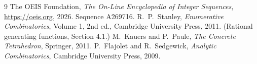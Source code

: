 \documentclass[11pt,a4paper]{article}
\theoremstyle{plain}
\theoremstyle{definition}
\begin{document}
\begin{thebibliography}{9}
 The OEIS Foundation, \emph{The On-Line Encyclopedia of Integer
Sequences}, \url{https://oeis.org}, 2026. Sequence A269716.
 R.~P.~Stanley, \emph{Enumerative Combinatorics}, Volume 1, 2nd ed.,
Cambridge University Press, 2011. (Rational generating functions, Section 4.1.)
 M.~Kauers and P.~Paule, \emph{The Concrete Tetrahedron}, Springer, 2011.
 P.~Flajolet and R.~Sedgewick, \emph{Analytic Combinatorics}, Cambridge
University Press, 2009.
\end{thebibliography}
\end{document}
